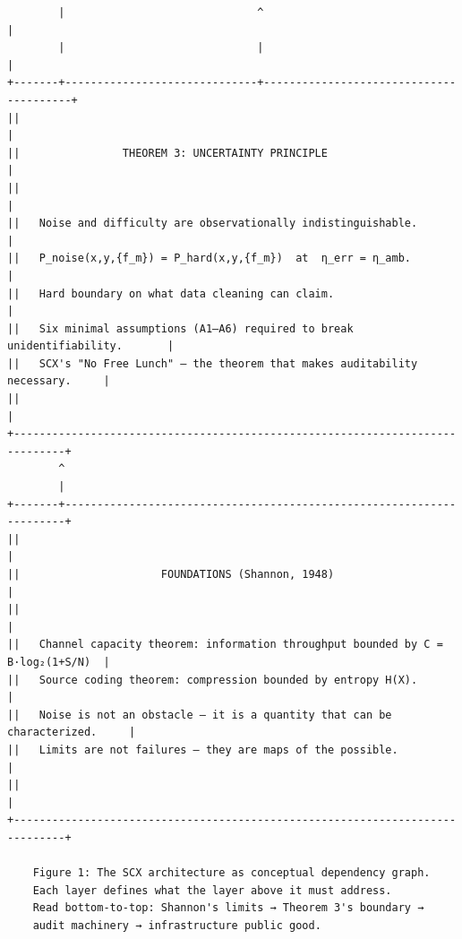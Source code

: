 \documentclass[11pt,a4paper]{article}
\theoremstyle{definition}
\begin{document}
\begin{center}
\begin{verbatim}
        |                              ^                                        |
        |                              |                                        |
+-------+------------------------------+----------------------------------------+
||                                                                              |
||                THEOREM 3: UNCERTAINTY PRINCIPLE                              |
||                                                                              |
||   Noise and difficulty are observationally indistinguishable.               |
||   P_noise(x,y,{f_m}) = P_hard(x,y,{f_m})  at  η_err = η_amb.               |
||   Hard boundary on what data cleaning can claim.                             |
||   Six minimal assumptions (A1–A6) required to break unidentifiability.       |
||   SCX's "No Free Lunch" — the theorem that makes auditability necessary.     |
||                                                                              |
+------------------------------------------------------------------------------+
        ^
        |
+-------+----------------------------------------------------------------------+
||                                                                              |
||                      FOUNDATIONS (Shannon, 1948)                             |
||                                                                              |
||   Channel capacity theorem: information throughput bounded by C = B·log₂(1+S/N)  |
||   Source coding theorem: compression bounded by entropy H(X).                |
||   Noise is not an obstacle — it is a quantity that can be characterized.     |
||   Limits are not failures — they are maps of the possible.                   |
||                                                                              |
+------------------------------------------------------------------------------+

    Figure 1: The SCX architecture as conceptual dependency graph.
    Each layer defines what the layer above it must address.                    
    Read bottom-to-top: Shannon's limits → Theorem 3's boundary →              
    audit machinery → infrastructure public good.                              
\end{verbatim}
\end{center}

\vspace{0.5em}
\end{document}
